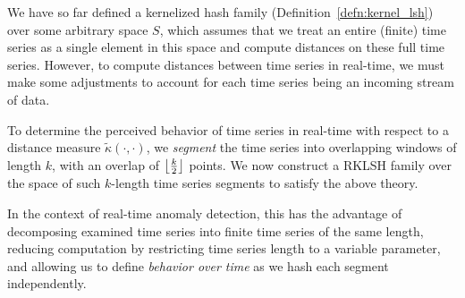 \documentclass[a4paper]{article}
\makeatletter
\theoremstyle{def}
\theoremstyle{thm}
\DeclarePairedDelimiter{\floor}{\lfloor}{\rfloor}
\newcommand{\todo}[1]{}
\renewcommand{\todo}[1]{{\color{red} TODO\@: {#1}}}
\makeatother
\begin{document}
We have so far defined a kernelized hash family (Definition~\ref{defn:kernel_lsh}) over some arbitrary space $S$, which assumes that we treat an entire (finite) time series as a single element in this space and compute distances on these full time series.
However, to compute distances between time series in real-time, we must make some adjustments to account for each time series being an incoming stream of data.

To determine the perceived behavior of time series in real-time with respect to a distance measure $\tilde{\kappa}(\cdot,\cdot)$, we \textit{segment} the time series into overlapping windows of length $k$, with an overlap of $\floor[\big]{\frac{k}{2}}$ points.
We now construct a RKLSH family over the space of such $k$-length time series segments to satisfy the above theory.

In the context of real-time anomaly detection, this has the advantage of decomposing examined time series into finite time series of the same length, reducing computation by restricting time series length to a variable parameter, and allowing us to define \textit{behavior over time} as we hash each segment independently.



\iffalse{}
\section{Results and Evaluation}
\subsection{Dynamic Time Warping}

\todo{We speculate that DTW has a fundamental weakness when dealing with time series.
    ``Stretching'' and ``folding'' time series to fit a distance measure errs on the side of similarity, which is unacceptable for anomaly detection.}

\subsection{Our Scheme}

\todo{Proof of hash approximating kernel distance measure, evaluation of detection probability, and algorithmic complexity evaluation.}

\fi



\end{document}
